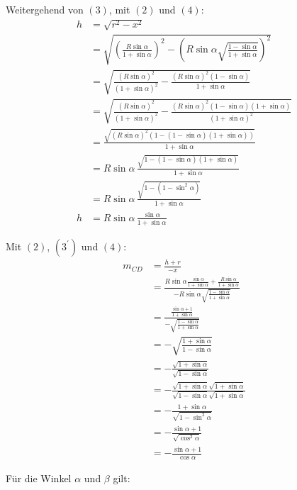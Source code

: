 \documentclass[12pt,a4paper,oneside]{article}
\begin{document}
\begin{samepage}
	Weitergehend von $(3)$, mit $(2)$ und $(4)$: \nopagebreak
	\begin{align*}
		h &= \sqrt{r^2-x^2} \\
		&= \sqrt{\left(\frac{R\sin\alpha}{1+\sin\alpha}\right)^2 - \left(R\sin\alpha\sqrt{\frac{1-\sin\alpha}{1+\sin\alpha}}\right)^2} \\
		&= \sqrt{\frac{(R\sin\alpha)^2}{(1+\sin\alpha)^2} - \frac{(R\sin\alpha)^2(1-\sin\alpha)}{1+\sin\alpha}} \\
		&= \sqrt{\frac{(R\sin\alpha)^2}{(1+\sin\alpha)^2} - \frac{(R\sin\alpha)^2(1-\sin\alpha)(1+\sin\alpha)}{(1+\sin\alpha)^2}} \\
		&= \frac{\sqrt{(R\sin\alpha)^2(1-(1-\sin\alpha)(1+\sin\alpha))}}{1+\sin\alpha} \\
		&= R\sin\alpha \, \frac{\sqrt{1-(1-\sin\alpha)(1+\sin\alpha)}}{1+\sin\alpha} \\
		&= R\sin\alpha \, \frac{\sqrt{1-(1-\sin^2\alpha)}}{1+\sin\alpha} \\
		h &= R\sin\alpha \, \frac{\sin\alpha}{1+\sin\alpha} \tag{$3^\prime$}
	\end{align*}
\end{samepage} \goodbreak

\begin{samepage}
	Mit $(2)$, $(3^\prime)$ und $(4)$: \nopagebreak
	\begin{align*}
		m_{CD} &= \frac{h+r}{-x} \\
		&= \frac{R\sin\alpha \frac{\sin\alpha}{1+\sin\alpha} + \frac{R\sin\alpha}{1+\sin\alpha}}{-R\sin\alpha\sqrt{\frac{1-\sin\alpha}{1+\sin\alpha}}} \\
		&= \frac{\frac{\sin\alpha+1}{1+\sin\alpha}}{-\sqrt{\frac{1-\sin\alpha}{1+\sin\alpha}}} \\
		&= -\sqrt{\frac{1+\sin\alpha}{1-\sin\alpha}} \\
		&= -\frac{\sqrt{1+\sin\alpha}}{\sqrt{1-\sin\alpha}} \\
		&= -\frac{\sqrt{1+\sin\alpha}\sqrt{1+\sin\alpha}}{\sqrt{1-\sin\alpha}\sqrt{1+\sin\alpha}} \\
		&= -\frac{1+\sin\alpha}{\sqrt{1 - \sin^2\alpha}} \\
		&= -\frac{\sin\alpha+1}{\sqrt{\cos^2\alpha}} \\[15pt]
		&= -\frac{\sin\alpha+1}{\cos\alpha}
	\end{align*}
\end{samepage}

\pagebreak
Für die Winkel $\alpha$ und $\beta$ gilt:
\end{document}
